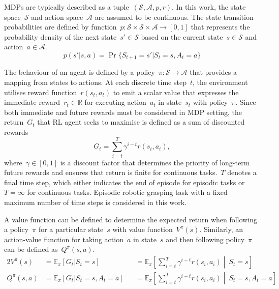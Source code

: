 MDPs are typically described as a tuple~\((\mathcal{S}, \mathcal{A}, p, r)\). In this work, the state space~\(\mathcal{S}\) and action space~\(\mathcal{A}\) are assumed to be continuous. The state transition probabilities are defined by function~\(p : \mathcal{S} \times \mathcal{S} \times \mathcal{A} \rightarrow [0, 1]\) that represents the probability density of the next state~\(s' \in \mathcal{S}\) based on the current state~\(s \in \mathcal{S}\) and action~\(a \in \mathcal{A}\).
\begin{equation}
    p(s' \vert s, a) = \Pr\{S_{t+1}{=}s' \vert S_{t}{=}s, A_{t}{=}a\}
\end{equation}

The behaviour of an agent is defined by a policy~\(\pi : \mathcal{S} \rightarrow \mathcal{A}\) that provides a mapping from states to actions. At each discrete time step~\(t\), the environment utilises reward function~\(r(s_{t}, a_{t})\) to emit a scalar value that expresses the immediate reward~\(r_{t} \in \mathbb{R}\) for executing action~\(a_{t}\) in state~\(s_{t}\) with policy~\(\pi\). Since both immediate and future rewards must be considered in MDP setting, the return~\(G_{t}\) that RL agent seeks to maximise is defined as a sum of discounted rewards
\begin{equation}
    G_{t} = \sum\limits_{i=t}^T \gamma^{i-t} r(s_{i}, a_{i}),
\end{equation}
where~\(\gamma \in [0, 1]\) is a discount factor that determines the priority of long-term future rewards and ensures that return is finite for continuous tasks.~\(T\) denotes a final time step, which either indicates the end of episode for episodic tasks or~\(T=\infty\) for continuous tasks. Episodic robotic grasping task with a fixed maximum number of time steps is considered in this work.

A value function can be defined to determine the expected return when following a policy~\(\pi\) for a particular state~\(s\) with value function~\(V^{\pi}(s)\). Similarly, an action-value function for taking action~\(a\) in state~\(s\) and then following policy~\(\pi\) can be defined as~\(Q^{\pi}(s, a)\).
\begin{alignat}{2}
    V^{\pi}(s)    & = \mathbb{E}_{\pi} [G_{t} \vert S_{t}{=}s]            &  & = \mathbb{E}_{\pi} \left[ \sum\limits_{i=t}^T \gamma^{i-t} r(s_{i}, a_{i}) \middle\vert\ S_{t}{=}s \right]
    \label{eq:state_value_function}                                                                                                                                                                  \\
    Q^{\pi}(s, a) & = \mathbb{E}_{\pi} [G_{t} \vert S_{t}{=}s, A_{t}{=}a] &  & = \mathbb{E}_{\pi} \left[ \sum\limits_{i=t}^T \gamma^{i-t} r(s_{i}, a_{i}) \middle\vert\ S_{t}{=}s, A_{t}{=}a \right]
    \label{eq:action_value_function}
\end{alignat}

